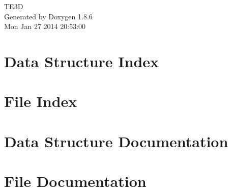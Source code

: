 \documentclass[twoside]{book}
\newcommand{\clearemptydoublepage}{%
  \newpage{\pagestyle{empty}\cleardoublepage}%
}
\begin{document}
\hypersetup{pageanchor=false}
\begin{titlepage}
\vspace*{7cm}
\begin{center}%
{\Large T\-E3\-D }\\
\vspace*{1cm}
{\large Generated by Doxygen 1.8.6}\\
\vspace*{0.5cm}
{\small Mon Jan 27 2014 20:53:00}\\
\end{center}
\end{titlepage}
\clearemptydoublepage
\tableofcontents
\clearemptydoublepage
{}
\hypersetup{pageanchor=true}

\chapter{Data Structure Index}

\chapter{File Index}

\chapter{Data Structure Documentation}

















\chapter{File Documentation}






















\newpage
{}
{}
\printindex
\end{document}
